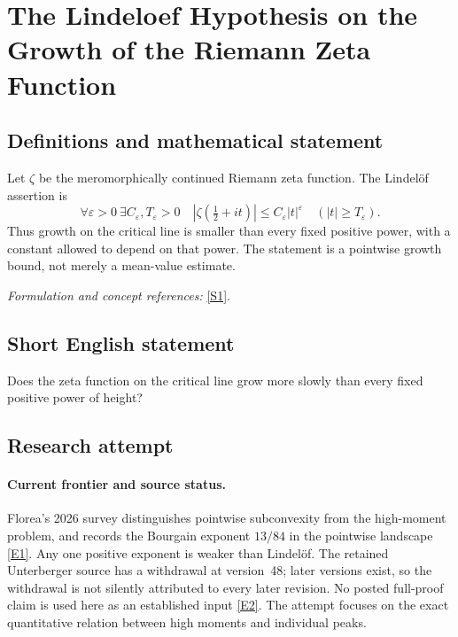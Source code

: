 \documentclass[11pt,a4paper]{article}
\numberwithin{equation}{section}
\newcommand{\sref}[2]{\hyperlink{source:#1:#2}{[S#2]}}
\newcommand{\eref}[2]{\hyperlink{extra:#1:#2}{[E#2]}}
\newif\ifshowcatalogue
\newcommand{\cataloguescope}[1]{\ifshowcatalogue
 \paragraph{Exact scope in the supplied catalogue.}
 \begin{quote}\small #1\end{quote}\fi}
\begin{document}
\setcounter{section}{80}
\section{\texorpdfstring{The Lindeloef Hypothesis on the Growth of the Riemann Zeta Function}{The Lindeloef Hypothesis on the Growth of the Riemann Zeta Function}}\label{81}
\subsection{Definitions and mathematical statement}
Let $\zeta$ be the meromorphically continued Riemann zeta function. The Lindelöf assertion is
\[
 \forall\varepsilon>0\ \exists C_\varepsilon,T_\varepsilon>0\quad
 |\zeta(\tfrac12+it)|\le C_\varepsilon|t|^\varepsilon
 \quad(|t|\ge T_\varepsilon).
\]
Thus growth on the critical line is smaller than every fixed positive power, with a constant allowed to depend on that power. The statement is a pointwise growth bound, not merely a mean-value estimate.
\par\smallskip\textit{Formulation and concept references:} \sref{81}{1}.
\cataloguescope{Prove that for every epsilon>0 there is a constant C\_epsilon such that |zeta(1/2+it)| <= C\_epsilon |t|\textasciicircum{}epsilon for all sufficiently large real |t|.}
\subsection{Short English statement}
Does the zeta function on the critical line grow more slowly than every fixed positive power of height?
\subsection{Research attempt}

\paragraph{Current frontier and source status.}
Florea's 2026 survey distinguishes pointwise subconvexity from the high-moment
problem, and records the Bourgain exponent $13/84$ in the pointwise
landscape \eref{81}{1}. Any one positive exponent is weaker than Lindel\"of.
The retained Unterberger source has a withdrawal at version~48; later
versions exist, so the withdrawal is not silently attributed to every
later revision. No posted full-proof claim is used here as an established
input \eref{81}{2}. The attempt focuses on the exact quantitative relation
between high moments and individual peaks.
\end{document}
